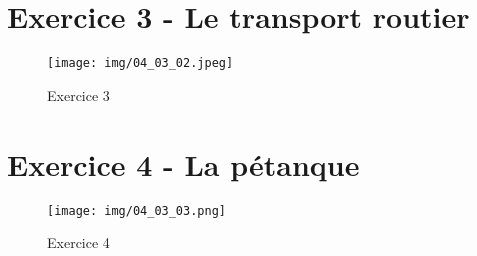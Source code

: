 \documentclass[a4paper,12pt]{article}
\begin{document}
\section{Exercice 3 - Le transport routier}

\begin{figure}[H]
  \centering
  \texttt{[image: img/04\_03\_02.jpeg]}
  \caption{\label{} Exercice 3}
\end{figure}

\section{Exercice 4 - La pétanque}

\begin{figure}[H]
  \centering
  \texttt{[image: img/04\_03\_03.png]}
  \caption{\label{} Exercice 4}
\end{figure}
\end{document}

